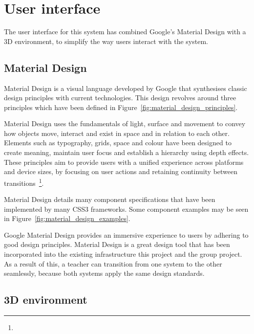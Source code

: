 \section{User interface} {
\label{sec:user_interface}

	The user interface for this system has combined Google's Material Design with a 3D environment, to simplify the way users interact with the system.

	\subsection{Material Design} {
	\label{sec:material_design}

		Material Design is a visual language developed by Google that synthesises classic design principles with current technologies. This design revolves around three principles which have been defined in Figure~\ref{fig:material_design_principles}.

		

		Material Design uses the fundamentals of light, surface and movement to convey how objects move, interact and exist in space and in relation to each other. Elements such as typography, grids, space and colour have been designed to create meaning, maintain user focus and establish a hierarchy using depth effects. These principles aim to provide users with a unified experience across platforms and device sizes, by focusing on user actions and retaining continuity between transitions~\footnote{}.

		Material Design details many component specifications that have been implemented by many CSS3 frameworks. Some component examples may be seen in Figure~\ref{fig:material_design_examples}.

		

		Google Material Design provides an immersive experience to users by adhering to good design principles. Material Design is a great design tool that has been incorporated into the existing infrastructure this project and the group project. As a result of this, a teacher can transition from one system to the other seamlessly, because both systems apply the same design standards.

	}

	\subsection{3D environment} {
	\label{sec:3d_environment}

}}
